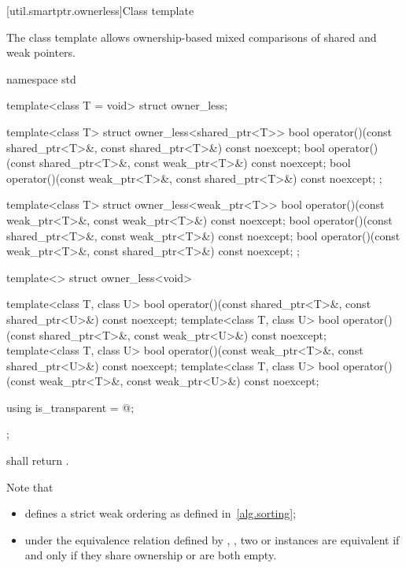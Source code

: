 [util.smartptr.ownerless]{Class template }

\pnum
The class template  allows ownership-based mixed comparisons of shared
and weak pointers.

%
\begin{codeblock}
namespace std {
  template<class T = void> struct owner_less;

  template<class T> struct owner_less<shared_ptr<T>> {
    bool operator()(const shared_ptr<T>&, const shared_ptr<T>&) const noexcept;
    bool operator()(const shared_ptr<T>&, const weak_ptr<T>&) const noexcept;
    bool operator()(const weak_ptr<T>&, const shared_ptr<T>&) const noexcept;
  };

  template<class T> struct owner_less<weak_ptr<T>> {
    bool operator()(const weak_ptr<T>&, const weak_ptr<T>&) const noexcept;
    bool operator()(const shared_ptr<T>&, const weak_ptr<T>&) const noexcept;
    bool operator()(const weak_ptr<T>&, const shared_ptr<T>&) const noexcept;
  };

  template<> struct owner_less<void> {
    template<class T, class U>
      bool operator()(const shared_ptr<T>&, const shared_ptr<U>&) const noexcept;
    template<class T, class U>
      bool operator()(const shared_ptr<T>&, const weak_ptr<U>&) const noexcept;
    template<class T, class U>
      bool operator()(const weak_ptr<T>&, const shared_ptr<U>&) const noexcept;
    template<class T, class U>
      bool operator()(const weak_ptr<T>&, const weak_ptr<U>&) const noexcept;

    using is_transparent = @\unspec@;
  };
}
\end{codeblock}

%
\pnum {} shall return . \begin{note}
Note that

\begin{itemize}
\item {} defines a strict weak ordering as defined in~\ref{alg.sorting};

\item under the equivalence relation defined by ,
, two  or
 instances are equivalent if and only if they share ownership or are
both empty.
\end{itemize} \end{note}


